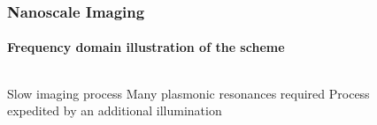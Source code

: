 \documentclass[mathserif,16pt,xcolor=table]{beamer}
\begin{document}
      \begin{frame}
        \frametitle{Nanoscale Imaging}
        \framesubtitle{Frequency domain illustration of the scheme}
        \begin{columns}[T] %
          \begin{column}{.45\textwidth}
            \begin{outline}[itemize]
              \1 Slow imaging process
                \2 Many plasmonic resonances required
              \1 Process expedited by an additional illumination
            \end{outline}
            \hspace{1cm}
            \begin{figure} \centering
              \fontsize{6}{7}\selectfont
              \def\svgwidth{.9\linewidth}
              
              \label{fig:sim}
            \end{figure}
          \end{column}
          \begin{column}[T]{.7\textwidth}
            \begin{figure}
              \centering \vspace*{-.5cm}
              \fontsize{6}{7}\selectfont
              \def\svgwidth{.7\linewidth}
              
              \label{fig:sim}
            \end{figure}
            \end{column}%
          \end{columns}
      \end{frame}
\end{document}
